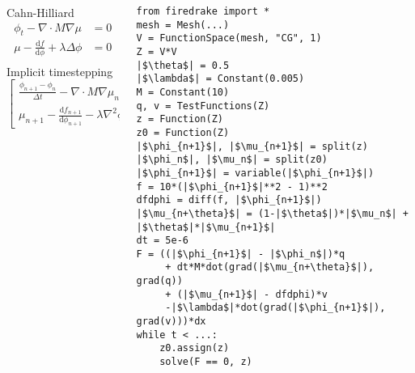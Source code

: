 \documentclass[presentation]{beamer}
\begin{document}
\begin{frame}[fragile]
  \begin{columns}
    \begin{column}{0.5\textwidth}
      \begin{block}{Cahn-Hilliard}
        \small
        \begin{align*}
          \phi_t - \nabla \cdot M \nabla \mu &= 0\\
          \mu - \frac{\text{d} f}{\text{d} \phi} + \lambda \Delta \phi &= 0\\
        \end{align*}
        Implicit timestepping
        \begin{equation*}
          \begin{bmatrix}
            \frac{\phi_{n+1} - \phi_n}{\Delta t} - \nabla \cdot M \nabla \mu_{n+\theta}\\
            \mu_{n+1} - \frac{\text{d} f_{n+1}}{\text{d} \phi_{n+1}} -
            \lambda \nabla^2\phi_{n+1}
          \end{bmatrix} = 0
        \end{equation*}
      \end{block}
    \end{column}
    \begin{column}{0.5\textwidth}
\begin{verbatim}
from firedrake import *
mesh = Mesh(...)
V = FunctionSpace(mesh, "CG", 1)
Z = V*V
|$\theta$| = 0.5
|$\lambda$| = Constant(0.005)
M = Constant(10)
q, v = TestFunctions(Z)
z = Function(Z)
z0 = Function(Z)
|$\phi_{n+1}$|, |$\mu_{n+1}$| = split(z)
|$\phi_n$|, |$\mu_n$| = split(z0)
|$\phi_{n+1}$| = variable(|$\phi_{n+1}$|)
f = 10*(|$\phi_{n+1}$|**2 - 1)**2
dfdphi = diff(f, |$\phi_{n+1}$|)
|$\mu_{n+\theta}$| = (1-|$\theta$|)*|$\mu_n$| + |$\theta$|*|$\mu_{n+1}$|
dt = 5e-6
F = ((|$\phi_{n+1}$| - |$\phi_n$|)*q 
     + dt*M*dot(grad(|$\mu_{n+\theta}$|), grad(q)) 
     + (|$\mu_{n+1}$| - dfdphi)*v
     -|$\lambda$|*dot(grad(|$\phi_{n+1}$|), grad(v)))*dx
while t < ...:
    z0.assign(z)
    solve(F == 0, z)
\end{verbatim}
    \end{column}
  \end{columns}
\end{frame}
\end{document}
